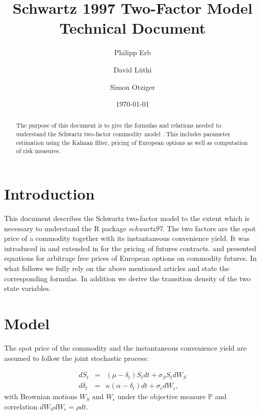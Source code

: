 \documentclass[a4paper,11pt]{article}
\title{Schwartz 1997 Two-Factor Model\\Technical Document}
\author{Philipp Erb \and David L\"{u}thi \and Simon Otziger}
\date{\today}
\newcommand{\RR}{\textsf{R}}
\newcommand{\Rpackage}{\textit{schwartz97}}
\newcommand{\sigmaS}{\sigma_S}
\newcommand{\sigmaE}{\sigma_\epsilon}
\begin{document}
\maketitle
\begin{abstract}
  The purpose of this document is to give the formulas and relations
  needed to understand the Schwartz two-factor commodity model
  \citep{Schwartz1997}. This includes parameter estimation using the
  Kalman filter, pricing of European options as well as computation of
  risk measures.
\end{abstract}

\section{Introduction}\label{sec:intro}
This document describes the Schwartz two-factor model to the extent
which is necessary to understand the \RR{} package \Rpackage.  The two
factors are the spot price of a commodity together with its
instantaneous convenience yield. It was introduced in
\cite{Gibson1990} and extended in \cite{Schwartz1997} for the pricing
of futures contracts. \cite{Miltersen1998} and \cite{Hilliard1998}
presented equations for arbitrage free prices of European options on
commodity futures. In what follows we fully rely on the above
mentioned articles and state the corresponding formulas. In addition
we derive the transition density of the two state variables.
\section{Model}\label{sec:model}
The spot price of the commodity and the instantaneous convenience
yield are assumed to follow the joint stochastic process:

\begin{eqnarray}
  dS_t &=& (\mu - \delta_t) S_t dt + \sigmaS S_t
  dW_S   \label{eq:Pdynamics-S} \\
  d\delta_t &=& \kappa (\alpha - \delta_t) dt + \sigmaE
  dW_\epsilon, \label{eq:Pdynamics-delta}
\end{eqnarray}
with Brownian motions $W_S$ and $W_\epsilon$ under the objective
measure $\mathbb{P}$ and correlation $dW_SdW_\epsilon = \rho dt$.
\end{document}
